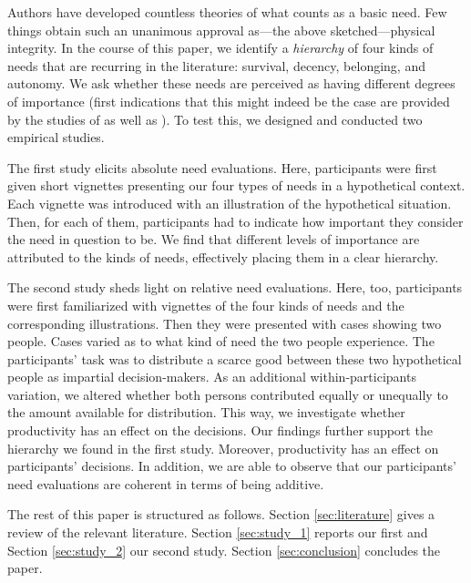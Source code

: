\documentclass[egregdoesnotlikesansseriftitles]{scrartcl}
\begin{document}
Authors have developed countless theories of what counts as a basic need.
Few things obtain such an unanimous approval as---the above sketched---physical integrity.
In the course of this paper, we identify a \textit{hierarchy} of four kinds of needs that are recurring in the literature: survival, decency, belonging, and autonomy.
We ask whether these needs are perceived as having different degrees of importance (first indications that this might indeed be the case are provided by the studies of \citealt{poelzler_typicality_2022} as well as \citealt{bauer_needs_forthcoming}).
To test this, we designed and conducted two empirical studies.

The first study elicits absolute need evaluations.
Here, participants were first given short vignettes presenting our four types of needs in a hypothetical context.
Each vignette was introduced with an illustration of the hypothetical situation.
Then, for each of them, participants had to indicate how important they consider the need in question to be.
We find that different levels of importance are attributed to the kinds of needs, effectively placing them in a clear hierarchy.

The second study sheds light on relative need evaluations.
Here, too, participants were first familiarized with vignettes of the four kinds of needs and the corresponding illustrations.
Then they were presented with cases showing two people.
Cases varied as to what kind of need the two people experience.
The participants' task was to distribute a scarce good between these two hypothetical people as impartial decision-makers.
As an additional within-participants variation, we altered whether both persons contributed equally or unequally to the amount available for distribution.
This way, we investigate whether productivity has an effect on the decisions.
Our findings further support the hierarchy we found in the first study.
Moreover, productivity has an effect on participants' decisions.
In addition, we are able to observe that our participants' need evaluations are coherent in terms of being additive.

The rest of this paper is structured as follows.
Section \ref{sec:literature} gives a review of the relevant literature.
Section \ref{sec:study_1} reports our first and Section \ref{sec:study_2} our second study.
Section \ref{sec:conclusion} concludes the paper.


\end{document}
